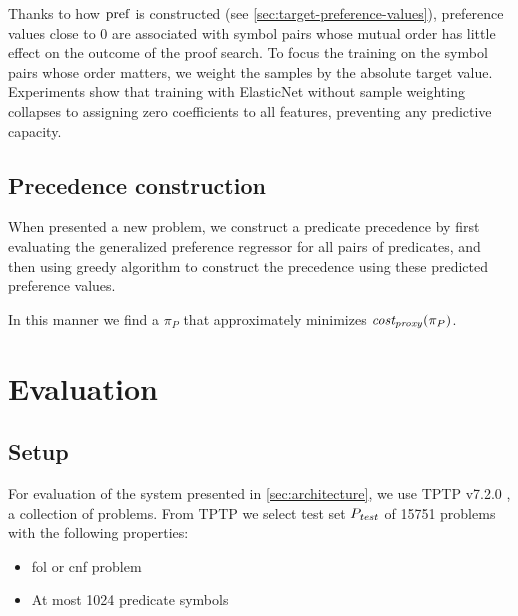 Thanks to how \(\operatorname{pref}\) is constructed (see \autoref{sec:target-preference-values}),
preference values close to 0 are associated with symbol pairs whose mutual order has little effect
on the outcome of the proof search.
To focus the training on the symbol pairs whose order matters,
we weight the samples by the absolute target value.
Experiments show that training with ElasticNet without sample weighting
collapses to assigning zero coefficients to all features,
preventing any predictive capacity.



\subsection{Precedence construction}

When presented a new problem, we construct a predicate precedence by
first evaluating the generalized preference regressor for all pairs of predicates,
and then using greedy algorithm to construct the precedence using these predicted preference values.

In this manner we find a \(\pi_P\) that approximately minimizes \(\operatorname{\mathit{cost_{proxy}}}(\pi_P)\).

\section{Evaluation}
\label{sec:evaluation}

\subsection{Setup}

For evaluation of the system presented in \autoref{sec:architecture},
we use TPTP v7.2.0 \cite{?}, a collection of problems.
From TPTP we select test set \(P_{\mathit{test}}\) of 15751 problems with the following properties:

\begin{itemize}
	\item \gls{fol} or \gls{cnf} problem
	\item At most 1024 predicate symbols
\end{itemize}

